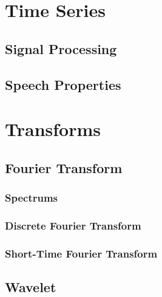 \documentclass{book}
\begin{document}
\begin{appendices}
\chapter{Time Series}
\section{Signal Processing}
\section{Speech Properties}

\chapter{Transforms}
\section{Fourier Transform}
\subsection{Spectrums}
\subsection{Discrete Fourier Transform}
\subsection{Short-Time Fourier Transform}
\section{Wavelet}


\end{appendices}
\end{document}
